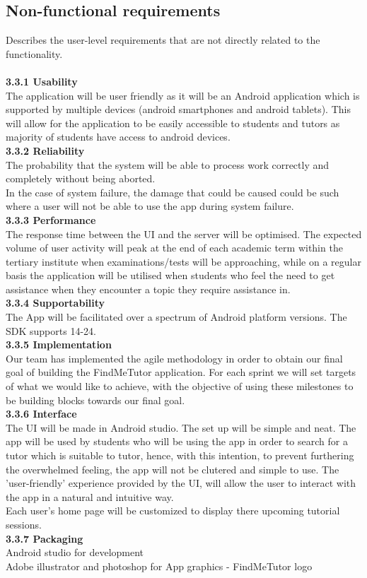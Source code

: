 \documentclass[12pt]{article}
\begin{document}
\subsection{Non-functional requirements}{
Describes the user-level requirements that are not directly related to the functionality. \\
\\\textbf{3.3.1 Usability}\\
The application will be user friendly as it will be an Android application which is supported by multiple devices (android smartphones and android tablets). This will allow for the application to be easily accessible to students and tutors as majority of students have access to android devices.
\\\textbf{3.3.2 Reliability}\\
The probability that the system will be able to process work correctly and completely without being aborted.\\
In the case of system failure, the damage that could be caused could be such where a user will not be able to use the app during system failure.
\\\textbf{3.3.3 Performance}\\
The response time between the UI and the server will be optimised. The expected volume of user activity will peak at the end of each academic term within the tertiary institute when examinations/tests will be approaching, while on a regular basis the application will be utilised when students who feel the need to get assistance when they encounter a topic they require assistance in.
\\\textbf{3.3.4 Supportability}\\
The App will be facilitated over a spectrum of Android platform versions. The SDK supports 14-24. \\
\textbf{3.3.5 Implementation}\\
Our team has implemented the agile methodology in order to obtain our final goal of building the FindMeTutor application. For each sprint we will set targets of what we would like to achieve, with the objective of using these milestones to be building blocks towards our final goal.
\\\textbf{3.3.6 Interface}\\
The UI will be made in Android studio. The set up will be simple and neat. The app will be used by students who will be using the app in order to search for a tutor which is suitable to tutor, hence, with this intention, to prevent furthering the overwhelmed feeling, the app will not be clutered and simple to use. The 'user-friendly' experience provided by the UI, will allow the user to interact with the app in a natural and intuitive way. \\
Each user's home page will be customized to display there upcoming tutorial sessions.\\
\textbf{3.3.7 Packaging}\\
Android studio for development\\
Adobe illustrator and photoshop for App graphics - FindMeTutor logo\\
}
\end{document}

